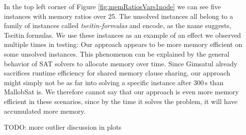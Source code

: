 \documentclass[12pt,a4paper,twoside]{scrartcl}
\numberwithin{equation}{section}
\begin{document}
In the top left corner of Figure \ref{fig:memRatiosVars1node} we can see five instances with memory ratios over 25. The unsolved instances all belong to a family of instances called \textit{tseitin-formulas} and encode, as the name suggests, Tseitin formulas. We use these instances as an example of an effect we observed multiple times in testing: Our approach appears to be more memory efficient on some unsolved instances. This phenomenon can be explained by the general behavior of SAT solvers to allocate memory over time. Since Gimsatul already sacrifices runtime efficiency for shared memory clause sharing, our approach might simply not be as far into solving a specific instance after $300\,$s than MallobSat is. We therefore cannot say that our approach is even more memory efficient in these scenarios, since by the time it solves the problem, it will have accumulated more memory.

TODO: more outlier discussion in plots
\end{document}
